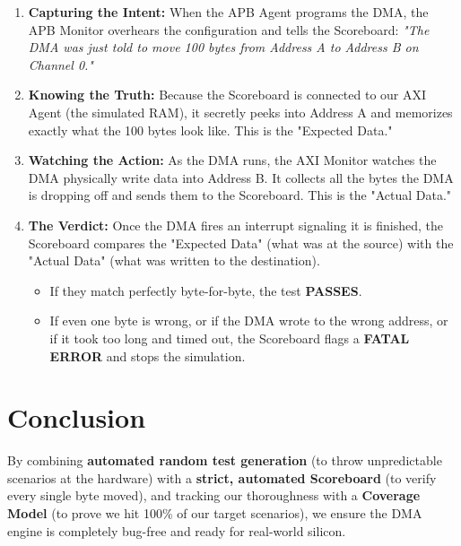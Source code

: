\documentclass[12pt]{article}
\begin{document}
\begin{enumerate}
    \item \textbf{Capturing the Intent:} When the APB Agent programs the DMA, the APB Monitor overhears the configuration and tells the Scoreboard: \textit{"The DMA was just told to move 100 bytes from Address A to Address B on Channel 0."}
    \item \textbf{Knowing the Truth:} Because the Scoreboard is connected to our AXI Agent (the simulated RAM), it secretly peeks into Address A and memorizes exactly what the 100 bytes look like. This is the "Expected Data."
    \item \textbf{Watching the Action:} As the DMA runs, the AXI Monitor watches the DMA physically write data into Address B. It collects all the bytes the DMA is dropping off and sends them to the Scoreboard. This is the "Actual Data."
    \item \textbf{The Verdict:} Once the DMA fires an interrupt signaling it is finished, the Scoreboard compares the "Expected Data" (what was at the source) with the "Actual Data" (what was written to the destination). 
    \begin{itemize}
        \item If they match perfectly byte-for-byte, the test \textbf{PASSES}.
        \item If even one byte is wrong, or if the DMA wrote to the wrong address, or if it took too long and timed out, the Scoreboard flags a \textbf{FATAL ERROR} and stops the simulation.
    \end{itemize}
\end{enumerate}

\section*{Conclusion}
By combining \textbf{automated random test generation} (to throw unpredictable scenarios at the hardware) with a \textbf{strict, automated Scoreboard} (to verify every single byte moved), and tracking our thoroughness with a \textbf{Coverage Model} (to prove we hit 100\% of our target scenarios), we ensure the DMA engine is completely bug-free and ready for real-world silicon.
\end{document}
